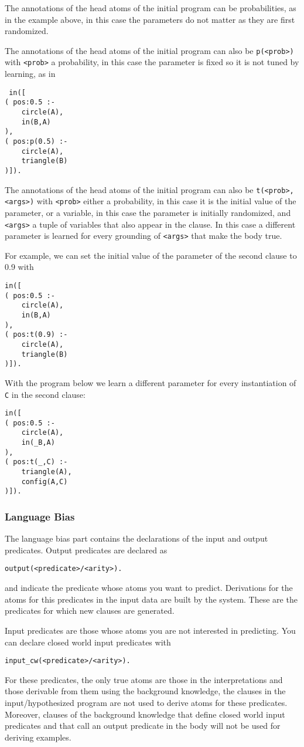 The annotations of the head atoms of the initial program can be 
 probabilities, as in the example above, in this case the  parameters do not matter as they are first randomized.

The annotations of the head atoms of the initial program can also be 
 \verb|p(<prob>)| with \verb|<prob>| a probability, in this case the parameter is fixed so it is not tuned by learning, as
 in 
 \begin{verbatim}
 in([
( pos:0.5 :-
 	circle(A),
 	in(B,A)
),
( pos:p(0.5) :-
 	circle(A),
 	triangle(B)
)]).
\end{verbatim}
The annotations of the head atoms of the initial program can also be 
 \verb|t(<prob>,<args>)| with \verb|<prob>| either a probability, in this case it is the initial value of the 
parameter, or a variable, in this case the parameter is initially randomized, and \verb|<args>| a tuple of variables
that also appear in the clause. In this case a different parameter is learned for every grounding of  
\verb|<args>| that make the body true.

For example, we can set the initial value of the parameter of the second clause to 0.9 with
 \begin{verbatim}
in([
( pos:0.5 :-
 	circle(A),
 	in(B,A)
),
( pos:t(0.9) :-
 	circle(A),
 	triangle(B)
)]).
\end{verbatim}
With the program below we learn a different parameter for every instantiation of \verb|C| in the second clause:
\begin{verbatim}
in([
( pos:0.5 :-
 	circle(A),
 	in(_B,A)
),
( pos:t(_,C) :-
 	triangle(A),
 	config(A,C)
)]).
\end{verbatim}

\subsubsection{Language Bias}
%
The language bias part contains the declarations of the input and output predicates.
Output predicates are declared as
\begin{verbatim}
output(<predicate>/<arity>).
\end{verbatim}
and indicate the predicate whose atoms you want to predict. Derivations for the atoms for this predicates in the input data
are built by the system. These are the predicates for which new clauses are generated.

Input predicates are those whose atoms you are not interested in predicting. You can declare closed world input predicates with
\begin{verbatim}
input_cw(<predicate>/<arity>).
\end{verbatim}
For these predicates, the only true atoms are those in the interpretations and those derivable from them using the background knowledge, the clauses in the input/hypothesized program are not used to derive atoms for these predicates. Moreover,   clauses of the background knowledge that define closed world input predicates and that call an output predicate in the body will not be used for deriving examples.

